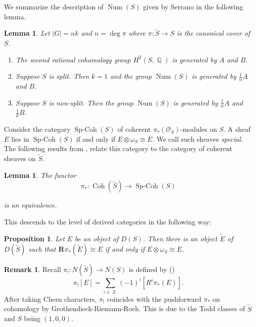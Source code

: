 \documentclass[a4paper, 12pt, twoside]{amsart}
\theoremstyle{plain}
\newtheorem{lemma}[theorem]{Lemma}
\newtheorem{proposition}[theorem]{Proposition}
\theoremstyle{definition}
\newtheorem{remark}[theorem]{Remark}
\DeclareMathOperator{\iso}{\cong}
\DeclareMathOperator{\num}{Num}
\DeclareMathOperator{\Coh}{Coh}
\DeclareMathOperator{\Z}{\mathbb{Z}}
\DeclareMathOperator{\Q}{\mathbb{Q}}
\DeclareMathOperator{\SpCoh}{Sp-Coh}
\begin{document}
We summarize the description of $\num(S)$  given by Serrano \cite[\S
1]{MR1038716} in the following lemma.

\begin{lemma}\label{lem:DesOfNum}
  Let $|G| = nk$ and $n = \deg \pi$ where
  $\pi \colon \widetilde{S} \to S$ is the canonical cover of $S$.
\begin{enumerate}
\item The second rational cohomology group $H^2(S,\Q)$ is generated by
  $A$ and $B$.
\item Suppose $S$ is split. Then $k=1$ and the group $\num(S)$ is
  generated by $\frac{1}{n}A$ and $B$.
\item Suppose $S$ is non-split. Then the group $\num(S)$ is generated
  by $\frac{1}{n}A$ and $\frac{1}{k}B$.
\end{enumerate}
\end{lemma}

Consider the category $\SpCoh(S)$ of coherent
$\pi_*(\mathcal{O}_S)$-modules on $S$. A sheaf $E$ lies in $\SpCoh(S)$
if and only if $E \otimes \omega_S \iso E$. We call such sheaves
\emph{special}. The following results from \cite[\S
2]{1998math.....11101B},\cite[\S 7.2]{MR2511017} relate this category
to the category of coherent sheaves on $\widetilde{S}$.

\begin{lemma}
  The functor
\[
\pi_* \colon \Coh(\widetilde{S}) \to \SpCoh(S)
\]

is an equivalence.
\end{lemma}

This descends to the level of derived categories in the following way:
\begin{proposition}\label{prop:derived-sheav-classes}
  Let $E$ be an object of $D(S)$. Then there is an object
  $\widetilde{E}$ of $D(\widetilde{S})$ such that
  $\mathbf{R}\pi_*(\widetilde{E}) \iso E$ if and only if
  $E \otimes \omega_S \iso E$.
\end{proposition}

\begin{remark}
  Recall $\pi_! \colon N(\widetilde{S}) \to N(S)$ is defined by
  (\cite[\S 5.2]{MR2244106})
  \[
    \pi_![E] = \sum_{i \in \Z} (-1)^i[R^i\pi_*(E)].
  \]
  After taking Chern characters, $\pi_!$ coincides with the
  pushforward $\pi_*$ on cohomology by Grothendieck-Riemann-Roch. This
  is due to the Todd classes of $\widetilde{S}$ and $S$ being
  $(1,0,0)$.
\end{remark}
\end{document}
